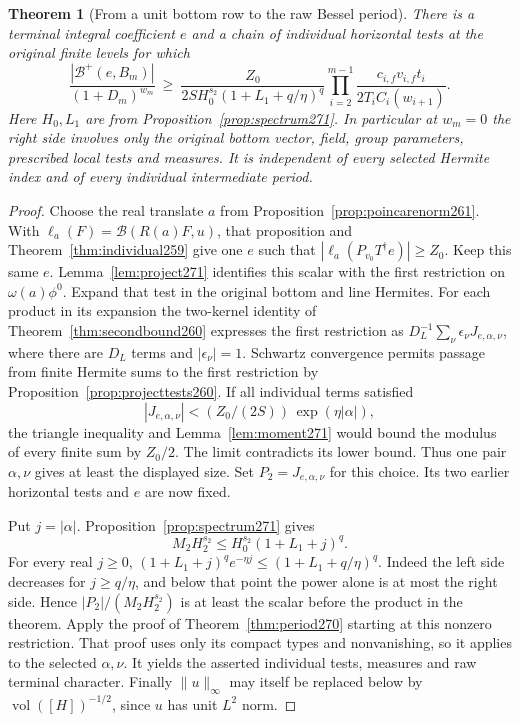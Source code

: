 \documentclass[a4paper,11pt]{article}
\newtheorem{theorem}[proposition]{Theorem}
\theoremstyle{definition}
\theoremstyle{remark}
\numberwithin{equation}{section}
\begin{document}
\begin{theorem}[From a unit bottom row to the raw Bessel period]\leavevmode
\label{thm:bottom271}
There is a terminal integral coefficient \(e\) and a chain of
individual horizontal tests at the original finite levels for
which
\[
 \frac{|\mathcal B^+(e,B_m)|}{(1+D_m)^{w_m}}
 \ \ge\
 \frac{Z_0}{2S H_0^{s_2}(1+L_1+q/\eta)^q}
 \prod_{i=2}^{m-1}\frac{c_{i,f}v_{i,f}t_i}{2T_i C_i(w_{i+1})}.
\]
Here \(H_0,L_1\) are from Proposition~\ref{prop:spectrum271}.
In particular at \(w_m=0\) the right side involves only the
original bottom vector, field, group parameters, prescribed
local tests and measures. It is independent of every selected
Hermite index and of every individual intermediate period.
\end{theorem}
\begin{proof}
Choose the real translate \(a\) from
Proposition~\ref{prop:poincarenorm261}. With
\(\ell_a(F)=\mathcal B(R(a)F,u)\), that proposition and
Theorem~\ref{thm:individual259} give one \(e\) such that
\(\left|\ell_a(P_{v_0}T^\dagger e)\right|\ge Z_0\).
Keep this same \(e\). Lemma~\ref{lem:project271} identifies
this scalar with the first restriction on
\(\omega(a)\phi^0\). Expand that test in the original bottom
and line Hermites. For each product in its expansion the
two-kernel identity of Theorem~\ref{thm:secondbound260}
expresses the first restriction as
\(D_L^{-1}\sum_\nu\epsilon_\nu J_{e,\alpha,\nu}\), where
there are \(D_L\) terms and \(|\epsilon_\nu|=1\).
Schwartz convergence permits passage from finite Hermite
sums to the first restriction by
Proposition~\ref{prop:projecttests260}. If all individual
terms satisfied
\[
       |J_{e,\alpha,\nu}|<
              (Z_0/(2S))\,\exp(\eta|\alpha|),
\]
the triangle inequality and Lemma~\ref{lem:moment271} would
bound the modulus of every finite sum by \(Z_0/2\).
The limit contradicts its lower bound. Thus one pair
\(\alpha,\nu\) gives at least the displayed size. Set
\(P_2=J_{e,\alpha,\nu}\) for this choice. Its two earlier
horizontal tests and \(e\) are now fixed.

Put \(j=|\alpha|\). Proposition~\ref{prop:spectrum271} gives
\[
       M_2 H_2^{s_2}\le H_0^{s_2}(1+L_1+j)^q .
\]
For every real \(j\ge0\),
\((1+L_1+j)^q e^{-\eta j}\le(1+L_1+q/\eta)^q\).
Indeed the left side decreases for \(j\ge q/\eta\), and
below that point the power alone is at most the right side.
Hence \(|P_2|/(M_2H_2^{s_2})\) is at least the scalar before
the product in the theorem. Apply the proof of
Theorem~\ref{thm:period270} starting at this nonzero
restriction. That proof uses only its compact types and
nonvanishing, so it applies to the selected \(\alpha,\nu\).
It yields the asserted individual tests, measures and raw
terminal character. Finally \(\|u\|_\infty\) may itself be
replaced below by \(\operatorname{vol}([H])^{-1/2}\), since
\(u\) has unit \(L^2\) norm.
\end{proof}
\end{document}
